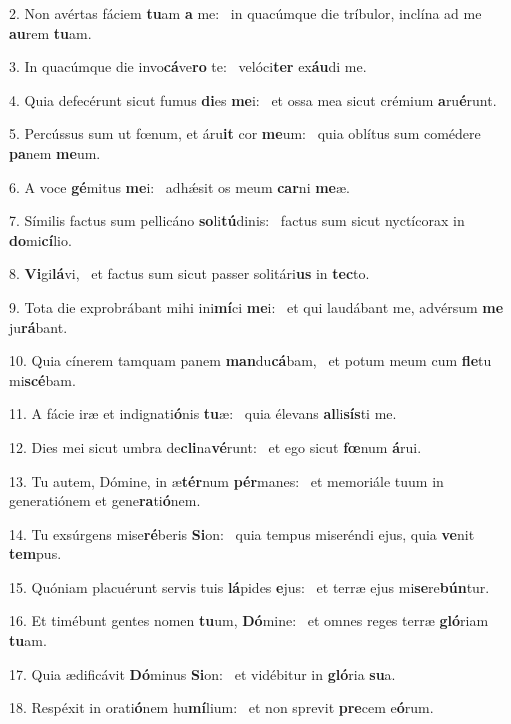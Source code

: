 2. Non avértas fáciem \textbf{tu}am \textbf{a} me: \ast\  in quacúmque die tríbulor, inclína ad me \textbf{au}rem \textbf{tu}am.\

3. In quacúmque die invo\textbf{cá}ve\textbf{ro} te: \ast\  velóci\textbf{ter} ex\textbf{áu}di me.\

4. Quia defecérunt sicut fumus \textbf{di}es \textbf{me}i: \ast\  et ossa mea sicut crémium \textbf{a}ru\textbf{é}runt.\

5. Percússus sum ut fœnum, et áru\textbf{it} cor \textbf{me}um: \ast\  quia oblítus sum comédere \textbf{pa}nem \textbf{me}um.\

6. A voce \textbf{gé}mitus \textbf{me}i: \ast\  adhǽsit os meum \textbf{car}ni \textbf{me}æ.\

7. Símilis factus sum pellicáno \textbf{so}li\textbf{tú}dinis: \ast\  factus sum sicut nyctícorax in \textbf{do}mi\textbf{cí}lio.\

8. \textbf{Vi}gi\textbf{lá}vi, \ast\  et factus sum sicut passer solitári\textbf{us} in \textbf{tec}to.\

9. Tota die exprobrábant mihi ini\textbf{mí}ci \textbf{me}i: \ast\  et qui laudábant me, advérsum \textbf{me} ju\textbf{rá}bant.\

10. Quia cínerem tamquam panem \textbf{man}du\textbf{cá}bam, \ast\  et potum meum cum \textbf{fle}tu mi\textbf{scé}bam.\

11. A fácie iræ et indignati\textbf{ó}nis \textbf{tu}æ: \ast\  quia élevans \textbf{al}li\textbf{sís}ti me.\

12. Dies mei sicut umbra de\textbf{cli}na\textbf{vé}runt: \ast\  et ego sicut \textbf{fœ}num \textbf{á}rui.\

13. Tu autem, Dómine, in æ\textbf{tér}num \textbf{pér}manes: \ast\  et memoriále tuum in generatiónem et gene\textbf{ra}ti\textbf{ó}nem.\

14. Tu exsúrgens mise\textbf{ré}beris \textbf{Si}on: \ast\  quia tempus miseréndi ejus, quia \textbf{ve}nit \textbf{tem}pus.\

15. Quóniam placuérunt servis tuis \textbf{lá}pides \textbf{e}jus: \ast\  et terræ ejus mi\textbf{se}re\textbf{bún}tur.\

16. Et timébunt gentes nomen \textbf{tu}um, \textbf{Dó}mine: \ast\  et omnes reges terræ \textbf{gló}riam \textbf{tu}am.\

17. Quia ædificávit \textbf{Dó}minus \textbf{Si}on: \ast\  et vidébitur in \textbf{gló}ria \textbf{su}a.\

18. Respéxit in orati\textbf{ó}nem hu\textbf{mí}lium: \ast\  et non sprevit \textbf{pre}cem e\textbf{ó}rum.\

